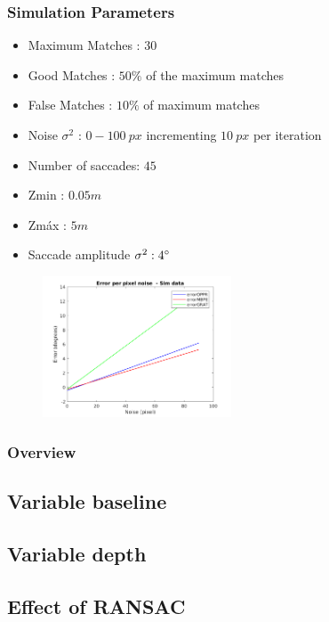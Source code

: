 \subsubsection{Simulation Parameters}
\begin{itemize}
	\item Maximum Matches : $30$
	\item Good Matches : $50 \%$ of the maximum matches
	\item False Matches : $10 \%$ of maximum matches
	\item Noise $\sigma^2$ : $0-100 \ px$ incrementing $10 \ px$ per iteration
	\item Number of saccades: $45$
	\item Zmin : $0.05 m$
	\item Zmáx : $5 m$
	\item Saccade amplitude $\sigma^2 : 4 \degree $
\end{itemize}
\begin{figure}[ht]
	\centering
	\includegraphics[width=0.5\textwidth]{images/sim/noise.png}
	\label{cha5:sec1:noise}
\end{figure}
\subsubsection{Overview}

\subsection{Variable baseline}
\subsection{Variable depth}

\subsection{Effect of RANSAC}

